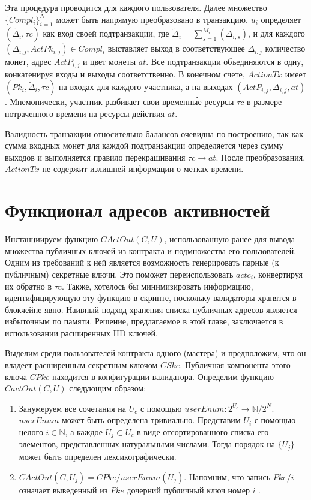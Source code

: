 \documentclass[specification,annotation]{itmo-student-thesis}
\begin{document}
Эта процедура проводится для каждого пользователя. Далее множество
$\{Compl_i\}_{i=1}^N$ может быть напрямую преобразовано в
транзакцию. $u_i$ определяет $(\tilde{\Delta}_i, \tau c)$ как вход
своей подтранзакции, где $\tilde{\Delta}_i =
\sum_{s=1}^{M_i}(\Delta_{i,s})$, и для каждого $(\Delta_{i,j},
ActPk_{i,j}) \in Compl_i$ выставляет выход в соответствующее
$\Delta_{i,j}$ количество монет, адрес $ActP_{i,j}$ и цвет монеты
$at$. Все подтранзакции объединяются в одну, конкатенируя входы и
выходы соответственно. В конечном счете, $ActionTx$ имеет $(Pk_i,
\tilde{\Delta}_i, \tau c)$ на входах для каждого участника, а на
выходах $(ActP_{i,j}, \Delta_{i,j}, at)$. Мнемонически, участник
разбивает свои временн\'{ы}е ресурсы $\tau c$ в размере потраченного
времени на ресурсы действия $at$.

Валидность транзакции относительно балансов очевидна по построению,
так как сумма входных монет для каждой подтранзакции определяется
через сумму выходов и выполняется правило перекрашивания $\tau c
\rightarrow at$. После преобразования, $ActionTx$ не содержит
излишней информации о метках времени.

\section{Функционал адресов активностей}

Инстанциируем функцию $CActOut(C, U)$, использованную ранее для вывода
множества публичных ключей из контракта и подмножества его
пользователей. Одним из требований к ней является возможность
генерировать парные (к публичным) секретные ключи. Это поможет
переиспользовать $actc_i$, конвертируя их обратно в $\tau c$. Также,
хотелось бы минимизировать информацию, идентифицирующую эту функцию в
скрипте, поскольку валидаторы хранятся в блокчейне явно. Наивный
подход хранения списка публичных адресов является избыточным по
памяти. Решение, предлагаемое в этой главе, заключается в
использовании расширенных HD ключей.

Выделим среди пользователей контракта одного (мастера) и предположим,
что он владеет расширенным секретным ключом $CSke$. Публичная
компонента этого ключа $CPke$ находится в конфигурации
валидатора. Определим функцию $CactOut(C,U)$ следующим образом:

\begin{enumerate}
\item Занумеруем все сочетания на $U_c$ с помощью $userEnum : 2^{U_c}
  \rightarrow \mathbb{N} / 2^N$. $userEnum$ может быть определена
  тривиально. Представим $U_i$ с помощью целого $i \in \mathbb{N}$, а
  каждое $U_j \subset U_c$ в виде отсортированного списка его
  элементов, представленных натуральными числами. Тогда порядок на
  $\{U_j\}$ может быть определен лексикографически.
\item $CActOut(C,U_j) = CPke/userEnum(U_j)$. Напомним, что запись
  $Pke/i$ означает выведенный из $Pke$ дочерний публичный ключ номер
  $i$ .
\end{enumerate}
\end{document}
